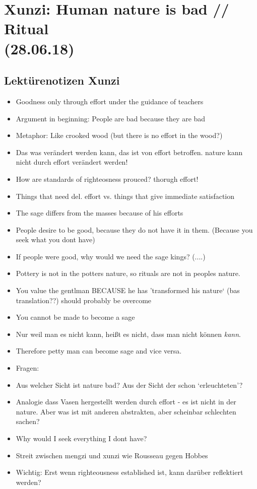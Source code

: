 \documentclass[emulatestandardclasses]{scrartcl}
\begin{document}
\section{Xunzi: Human nature is bad // Ritual\\(28.06.18)}

\subsection{Lektürenotizen Xunzi}

\begin{itemize}
  \item Goodness only through effort under the guidance of teachers
  \item Argument in beginning: People are bad because they are bad
  \item Metaphor: Like crooked wood (but there is no effort in the wood?)
  \item Das was verändert werden kann, das ist von effort betroffen. nature kann nicht durch effort verändert werden!
  \item How are standards of righteosness prouced? thorugh effort!
  \item Things that need del. effort vs. things that give immediate satisfaction
  \item The sage differs from the masses because of his efforts
  \item People desire to be good, because they do not have it in them. (Because you seek what you dont have)
  \item If people were good, why would we need the sage kings? (....)
  \item Pottery is not in the potters nature, so rituals are not in peoples nature.
  \item You value the gentlman BECAUSE he has 'transformed his nature‘ (bas translation??) should probably be overcome
  \item You cannot be made to become a sage
  \item Nur weil man es nicht kann, heißt es nicht, dass man nicht können \emph{kann}.
  \item Therefore petty man can become sage and vice versa.
  \item Fragen: 
  \item Aus welcher Sicht ist nature bad? Aus der Sicht der schon `erleuchteten'?
  \item Analogie dass Vasen hergestellt werden durch effort - es ist nicht in der nature. Aber was ist mit anderen abstrakten, aber scheinbar schlechten sachen?
  \item Why would I seek everything I dont have?
  \item Streit zwischen mengzi und xunzi wie Rousseau gegen Hobbes
  \item Wichtig: Erst wenn righteousness established ist, kann darüber reflektiert werden?
\end{itemize}
\end{document}
